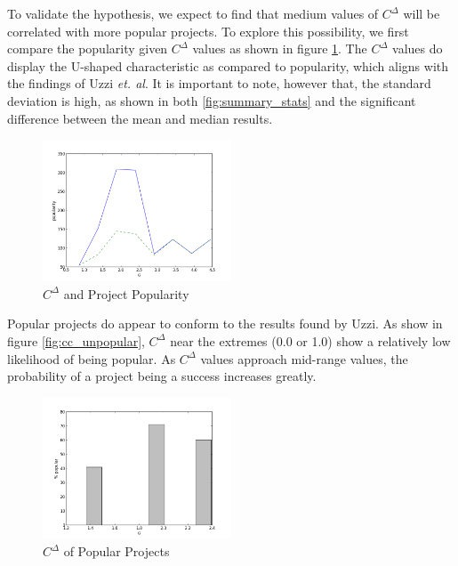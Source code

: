\documentclass{proc}
\begin{document}
To validate the hypothesis, we expect to find that medium values of $C^\Delta$ will be correlated with more popular projects. To explore this possibility, we first compare the popularity given $C^\Delta$ values as shown in figure \ref{fig:cc_graph}. The $C^\Delta$ values do display the U-shaped characteristic as compared to popularity, which aligns with the findings of Uzzi \textit{et. al}\cite{uzzi2005collaboration}. It is important to note, however that, the standard deviation is high, as shown in both \ref{fig:summary_stats} and the significant difference between the mean and median results.

\begin{figure}
\begin{center}
\includegraphics[width=0.5\textwidth]{images/freecode-graph.png}
\end{center}
\caption{$C^\Delta$ and Project Popularity}
\label{fig:cc_graph}
\end{figure}

Popular projects do appear to conform to the results found by Uzzi\cite{uzzi2005collaboration}. As show in figure \ref{fig:cc_unpopular}, $C^\Delta$ near the extremes (0.0 or 1.0) show a relatively low likelihood of being popular. As $C^\Delta$ values approach mid-range values, the probability of a project being a success increases greatly.


\begin{figure}
\begin{center}
\includegraphics[width=0.5\textwidth]{images/freecode-popular.png}
\end{center}
\caption{$C^\Delta$ of Popular Projects}
\label{fig:cc_popular}
\end{figure}
\end{document}
